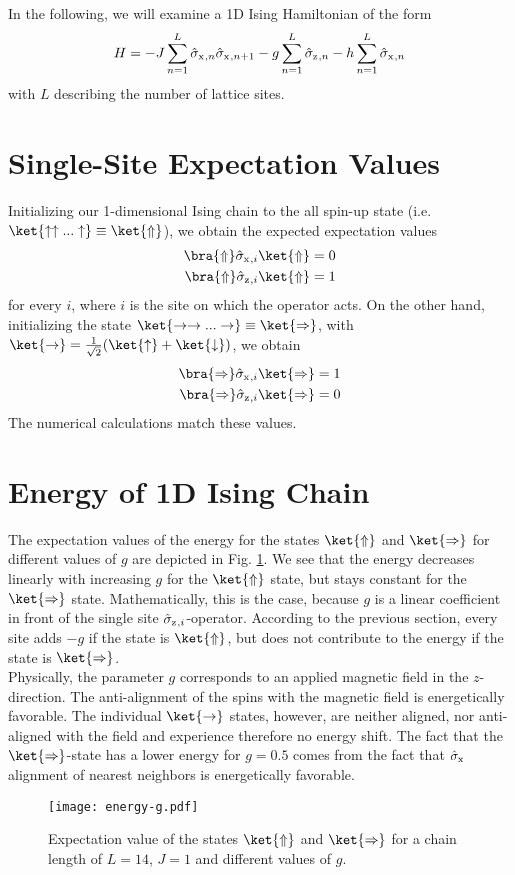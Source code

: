 \newcommand{\Up}{\ket{\Uparrow}}
\newcommand{\Right}{\ket{\Rightarrow}}
\newcommand{\LUp}{\bra{\Uparrow}}
\newcommand{\LRight}{\bra{\Rightarrow}}
In the following, we will examine a 1D Ising Hamiltonian of the form 
\begin{equation}
    H=-J\sum_{n=1}^L\sigmax{}_{,n}\sigmax{}_{,n+1}-g\sum_{n=1}^L\sigmaz{}_{,n}-h\sum_{n=1}^L\sigmax{}_{,n}
\end{equation}
with $L$ describing the number of lattice sites.

\section{Single-Site Expectation Values}
Initializing our 1-dimensional Ising chain to the all spin-up state (i.e. $\ket{\uparrow\uparrow...\uparrow}\equiv\Up$), we obtain the expected expectation values
\begin{align}
    \LUp\sigmax{}_{,i}\Up &= 0 \\
    \LUp\sigmaz{}_{,i}\Up &= 1
\end{align}
for every $i$, where $i$ is the site on which the operator acts. On the other hand, initializing the state $\ket{\rightarrow\rightarrow...\rightarrow}\equiv\Right$, with $\ket{\rightarrow}=\frac{1}{\sqrt{2}}(\ket{\uparrow}+\ket{\downarrow})$, we obtain
\begin{align}
    \LRight\sigmax{}_{,i}\Right &= 1 \\
    \LRight\sigmaz{}_{,i}\Right &= 0
\end{align}
The numerical calculations match these values.


\section{Energy of 1D Ising Chain}
The expectation values of the energy for the states $\Up$ and $\Right$ for different values of $g$ are depicted in Fig. \ref{fig:energy-g}. We see that the energy decreases linearly with increasing $g$ for the $\Up$ state, but stays constant for the $\Right$ state. Mathematically, this is the case, because $g$ is a linear coefficient in front of the single site $\sigmaz{}_{,i}$-operator. According to the previous section, every site adds $-g$ if the state is $\Up$, but does not contribute to the energy if the state is $\Right$.\\
Physically, the parameter $g$ corresponds to an applied magnetic field in the $z$-direction. The anti-alignment of the spins with the magnetic field is energetically favorable. The individual $\ket{\rightarrow}$ states, however, are neither aligned, nor anti-aligned with the field and experience therefore no energy shift. The fact that the $\Right$-state has a lower energy for $g=\num{0.5}$ comes from the fact that $\sigmax{}$ alignment of nearest neighbors is energetically favorable.  
\begin{figure}[htbp]
    \centering
    \texttt{[image: energy-g.pdf]}
    \caption{Expectation value of the states $\Up$ and $\Right$ for a chain length of $L=\num{14}$, $J=1$ and different values of $g$.}
    \label{fig:energy-g}
\end{figure}
\FloatBarrier
